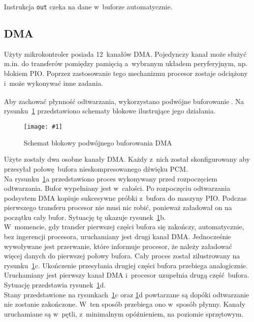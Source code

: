 \documentclass[polish]{aghengthesis}
\newcommand{\imgint}[4]{
	\begin{figure}[{#4}]
		\centering
		\texttt{[image: \#1]}
		\caption{#2}
		\label{#1}
	\end{figure}
}
\newcommand{\imgh}[3]{\imgint{#1}{#2}{#3}{H}}
\begin{document}
			Instrukcja \lstinline|out| czeka na dane w~buforze automatycznie.
		
		\subsection{DMA}
			Użyty mikrokontroler posiada 12~kanałów DMA.
			Pojedynczy kanał może służyć m.in. do transferów pomiędzy pamięcią a~wybranym układem peryferyjnym, np. blokiem PIO.
			Poprzez zastosowanie tego mechanizmu procesor zostaje odciążony i~może wykonywać inne zadania.
			$ $\\
			
			\newcommand{\rdmabuf}[1]{\ref{3/PicoRadio-dma-buf}#1}
			\newcommand{\dmacite}{\textsuperscript{\cite{dma_dbl_buf1} \cite{dma_dbl_buf2}}}
			
			Aby zachować płynność odtwarzania, wykorzystano podwójne buforowanie\dmacite{}. Na rysunku~\rdmabuf{} przedstawiono schematy blokowe ilustrujące jego działania.
			
			\imgh{3/PicoRadio-dma-buf}{Schemat blokowy podwójnego buforowania DMA\dmacite{}}{1}
			
			Użyte zostały dwa osobne kanały DMA. Każdy z~nich został skonfigurowany aby przesyłał połowę bufora nieskompresowanego dźwięku PCM.
			$ $\\
			
			Na rysunku~\rdmabuf{a} przedstawiono proces wykonywany przed rozpoczęciem odtwarzania.
			Bufor wypełniany jest w~całości.
			Po rozpoczęciu odtwarzania podsystem DMA kopiuje sukcesywne próbki z~bufora do maszyny PIO. Podczas pierwszego transferu procesor nie musi nic robić, ponieważ załadował on na początku cały bufor. Sytuację tę ukazuje rysunek~\rdmabuf{b}.
			$ $\\
			
			W~momencie, gdy transfer pierwszej części bufora się zakończy, automatycznie, bez ingerencji procesora, uruchamiany jest drugi kanał DMA. Jednocześnie wywoływane jest przerwanie, które informuje procesor, że należy załadować więcej danych do pierwszej połowy bufora. Cały proces został zilustrowany na rysunku~\rdmabuf{c}.
			Ukończenie przesyłania drugiej części bufora przebiega analogicznie. Uruchamiany jest pierwszy kanał DMA i~procesor uzupełnia drugą część bufora. Sytuację przedstawia rysunek~\rdmabuf{d}.
			$ $\\
		
			Stany przedstawione na rysunkach~\rdmabuf{c} oraz \rdmabuf{d} powtarzane są dopóki odtwarzanie nie zostanie zakończone. W~ten sposób przebiega ono w~sposób płynny. Kanały uruchamiane są w~pętli, z~minimalnym opóźnieniem, na poziomie sprzętowym. 			
		
\end{document}
